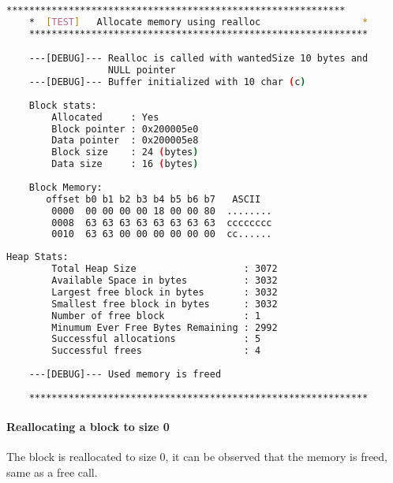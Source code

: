     \begin{outputbox}
    \begin{lstlisting}[language=bash]
    ************************************************************
    *  [TEST]   Allocate memory using realloc                  *
    ************************************************************

    ---[DEBUG]--- Realloc is called with wantedSize 10 bytes and
                  NULL pointer
    ---[DEBUG]--- Buffer initialized with 10 char (c)
    
    Block stats:
        Allocated     : Yes
        Block pointer : 0x200005e0
        Data pointer  : 0x200005e8
        Block size    : 24 (bytes)
        Data size     : 16 (bytes)
    
    Block Memory:
       offset b0 b1 b2 b3 b4 b5 b6 b7   ASCII
        0000  00 00 00 00 18 00 00 80  ........
        0008  63 63 63 63 63 63 63 63  cccccccc
        0010  63 63 00 00 00 00 00 00  cc......
    \end{lstlisting}
    \end{outputbox}

    \begin{outputbox}
    \begin{lstlisting}[language=bash]   
    Heap Stats:
        Total Heap Size                   : 3072
        Available Space in bytes          : 3032
        Largest free block in bytes       : 3032
        Smallest free block in bytes      : 3032
        Number of free block              : 1
        Minumum Ever Free Bytes Remaining : 2992
        Successful allocations            : 5
        Successful frees                  : 4
    
    ---[DEBUG]--- Used memory is freed
    
    ************************************************************
    \end{lstlisting}
    \end{outputbox}

    \paragraph{Reallocating a block to size 0}
    The block is reallocated to size 0, it can be observed that the memory is freed, same as a free call.

